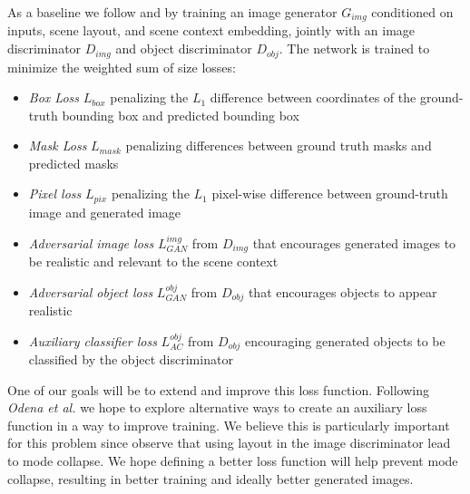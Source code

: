 \documentclass{article}
\begin{document}
As a baseline we follow \cite{sg2im} and \cite{sg2imgcontext} by training an image generator $G_{img}$ conditioned on inputs, scene layout, and scene context embedding, jointly with an image discriminator $D_{img}$ and object discriminator $D_{obj}$. The network is trained to minimize the weighted sum of size losses:
\begin{itemize}
\item \textit{Box Loss} $L_{box}$ penalizing the $L_1$ difference between coordinates of the ground-truth bounding box and predicted bounding box
\item \textit{Mask Loss} $L_{mask}$ penalizing differences between ground truth masks and predicted masks
\item \textit{Pixel loss} $L_{pix}$ penalizing the $L_1$ pixel-wise difference between ground-truth image and generated image
\item \textit{Adversarial image loss} $L_{GAN}^{img}$ from $D_{img}$ that encourages generated images to be realistic and relevant to the scene context
\item \textit{Adversarial object loss} $L_{GAN}^{obj}$ from $D_{obj}$ that encourages objects to appear realistic
\item \textit{Auxiliary classifier loss} $L_{AC}^{obj}$ from $D_{obj}$ encouraging generated objects to be classified by the object discriminator
\end{itemize}

One of our goals will be to extend and improve this loss function. Following \textit{Odena et al.} \cite{auxgan} we hope to explore alternative ways to create an auxiliary loss function in a way to improve training. We believe this is particularly important for this problem since \cite{sg2imgcontext} observe that using layout in the image discriminator lead to mode collapse. We hope defining a better loss function will help prevent mode collapse, resulting in better training and ideally better generated images.



\end{document}
